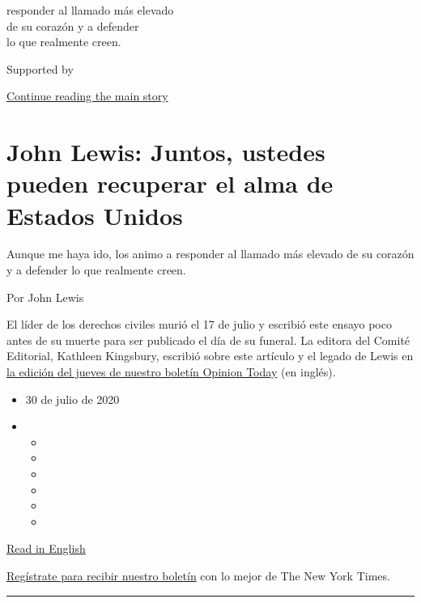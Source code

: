 responder al llamado más elevado\\
de su corazón y a defender\\
lo que realmente creen.

Supported by

\protect\hyperlink{after-sponsor}{Continue reading the main story}

\hypertarget{john-lewis-juntos-ustedes-pueden-recuperar-el-alma-de-estados-unidos}{%
\section{John Lewis: Juntos, ustedes pueden recuperar el alma de Estados
Unidos}\label{john-lewis-juntos-ustedes-pueden-recuperar-el-alma-de-estados-unidos}}

Aunque me haya ido, los animo a responder al llamado más elevado de su
corazón y a defender lo que realmente creen.

Por John Lewis

El líder de los derechos civiles murió el 17 de julio y escribió este
ensayo poco antes de su muerte para ser publicado el día de su funeral.
La editora del Comité Editorial, Kathleen Kingsbury, escribió sobre este
artículo y el legado de Lewis en
\href{https://www.nytimes.com/2020/07/30/opinion/john-lewis-op-ed.html}{la
edición del jueves de nuestro boletín Opinion Today} (en inglés).

\begin{itemize}
\item
  30 de julio de 2020
\item
  \begin{itemize}
  \item
  \item
  \item
  \item
  \item
  \item
  \end{itemize}
\end{itemize}

\href{https://www.nytimes.com/2020/07/30/opinion/john-lewis-civil-rights-america.html}{Read
in English}

\href{https://www.nytimes.com/newsletters/el-times}{Regístrate para
recibir nuestro boletín} con lo mejor de The New York Times.

\begin{center}\rule{0.5\linewidth}{\linethickness}\end{center}

